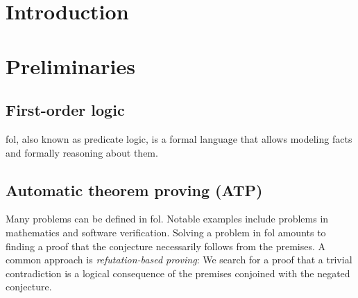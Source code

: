 \newcommand{\defn}\emph

\chapter{Introduction}



\chapter{Preliminaries}

\section{First-order logic}

\Gls{fol}, also known as predicate logic, is a formal language that allows modeling facts and formally reasoning about them.

\section{Automatic theorem proving (ATP)}

Many problems can be defined in \gls{fol}.
Notable examples include problems in mathematics and software verification.
Solving a problem in \gls{fol} amounts to finding a proof that the conjecture necessarily follows from the premises.
A common approach is \defn{refutation-based proving}:
We search for a proof that a trivial contradiction is a logical consequence of the premises conjoined with the negated conjecture.

